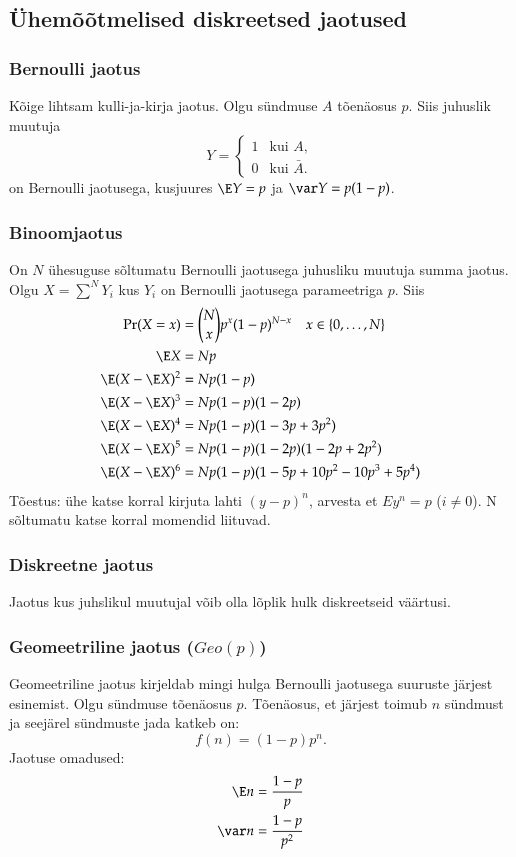 \documentclass[a4paper]{article}
\numberwithin{equation}{subsection}
\begin{document}
\subsection{Ühemõõtmelised diskreetsed jaotused}

\subsubsection{Bernoulli jaotus}
Kõige lihtsam kulli-ja-kirja jaotus.  Olgu sündmuse $A$ tõenäosus
$p$.  Siis juhuslik muutuja
\begin{equation}
  Y = 
  \begin{cases}
    1 & \text{kui $A$},\\
    0 & \text{kui $\bar A$.}
  \end{cases}
\end{equation}
on Bernoulli jaotusega, kusjuures $\E Y = p$ ja $\var Y = p(1-p)$.

\subsubsection{Binoomjaotus}
On $N$ ühesuguse sõltumatu Bernoulli jaotusega juhusliku muutuja summa
jaotus.  Olgu $X = \sum^N Y_i$ kus $Y_i$ on Bernoulli jaotusega
parameetriga $p$.  Siis
\begin{align*}
  \Pr(X = x) &= \binom{N}{x} p^x (1-p)^{N-x} \quad x\in \{0, \ldots ,N\}
  \\
  \E X &= Np \\
\E ( X - \E X)^2 &= N p( 1 - p) \\
\E ( X - \E X)^3 &= N p( 1 - p)( 1 - 2p)\\
\E ( X - \E X)^4 &= N p( 1 - p)( 1 - 3p + 3p^{2})
\\
\E ( X - \E X)^5 &= N p( 1 - p)(1 - 2p)( 1 - 2p + 2p^{2})
\\
\E ( X - \E X)^6 &= N p( 1 - p) (1 - 5p + 10p^2 - 10p^3 + 5p^4)
\end{align*}
Tõestus: ühe katse korral kirjuta lahti $(y-p)^n$, arvesta et $Ey^n=p$
($i\not=0$).  N sõltumatu katse korral momendid liituvad.

\subsubsection{Diskreetne jaotus}
Jaotus kus juhslikul muutujal võib olla lõplik hulk diskreetseid
väärtusi. 

\subsubsection{Geomeetriline jaotus ($Geo(p)$)}
Geomeetriline jaotus kirjeldab mingi hulga Bernoulli jaotusega
suuruste järjest esinemist.  Olgu sündmuse tõenäosus $p$.  Tõenäosus,
et järjest toimub $n$ sündmust ja seejärel sündmuste jada katkeb on:
\begin{equation}
f(n) = (1-p)p^n.
\end{equation}
Jaotuse omadused:
\begin{eqnarray}
\E n = \frac{1-p}{p}\\
\var n = \frac{1-p}{p^2}
\end{eqnarray}
\end{document}
